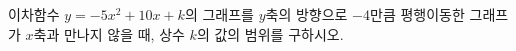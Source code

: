 \hspace*{2mm}\begin{minipage}[t]{\dimexpr\linewidth-2mm\relax}\vspace{0pt}
이차함수 $y=-5x^2+10x+k$의 그래프를 $y$축의 방향으로 $-4$만큼 평행이동한 그래프가 $x$축과 만나지 않을 때, 상수 $k$의 값의 범위를 구하시오.\end{minipage}
